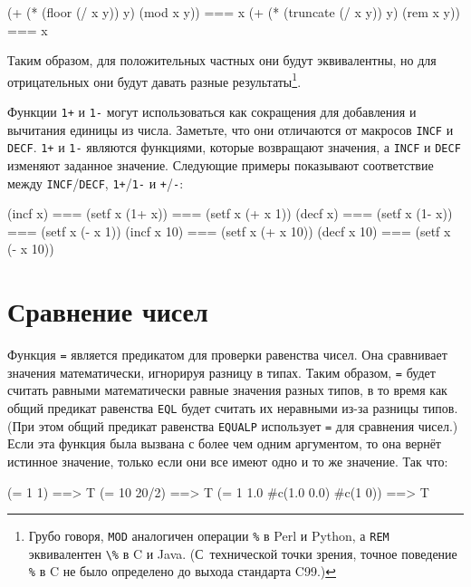 \begin{myverb}
(+ (* (floor    (/ x y)) y) (mod x y)) === x
(+ (* (truncate (/ x y)) y) (rem x y)) === x
\end{myverb}

Таким образом, для положительных частных они будут эквивалентны, но для отрицательных они
будут давать разные результаты\footnote{Грубо говоря, \lstinline{MOD} аналогичен операции
  \lstinline{%} в Perl и Python, а \lstinline{REM} эквивалентен \lstinline{\%} в C и
  Java. (С~технической точки зрения, точное поведение \lstinline{%} в C не было определено до
  выхода стандарта C99.)}.

Функции \lstinline{1+} и \lstinline{1-} могут использоваться как сокращения для добавления и
вычитания единицы из числа.  Заметьте, что они отличаются от макросов \lstinline{INCF} и
\lstinline{DECF}.  \lstinline{1+} и \lstinline{1-} являются функциями, которые возвращают значения, а
\lstinline{INCF} и \lstinline{DECF} изменяют заданное значение.  Следующие примеры показывают
соответствие между \lstinline{INCF}/\lstinline{DECF}, \lstinline{1+}/\lstinline{1-} и \lstinline{+}/\lstinline{-}:

\begin{myverb}
(incf x)    === (setf x (1+ x)) === (setf x (+ x 1))
(decf x)    === (setf x (1- x)) === (setf x (- x 1))
(incf x 10) === (setf x (+ x 10))
(decf x 10) === (setf x (- x 10))
\end{myverb}

\section{Сравнение чисел}

Функция \lstinline{=} является предикатом для проверки равенства чисел.  Она сравнивает
значения математически, игнорируя разницу в типах.  Таким образом, \lstinline{=} будет считать
равными математически равные значения разных типов, в то время как общий предикат
равенства \lstinline{EQL} будет считать их неравными из-за разницы типов. (При этом общий
предикат равенства \lstinline{EQUALP} использует \lstinline{=} для сравнения чисел.)  Если эта
функция была вызвана с более чем одним аргументом, то она вернёт истинное значение, только
если они все имеют одно и то же значение. Так что:

\begin{myverb}
(= 1 1)                        ==> T
(= 10 20/2)                    ==> T
(= 1 1.0 #c(1.0 0.0) #c(1 0))  ==> T
\end{myverb}

